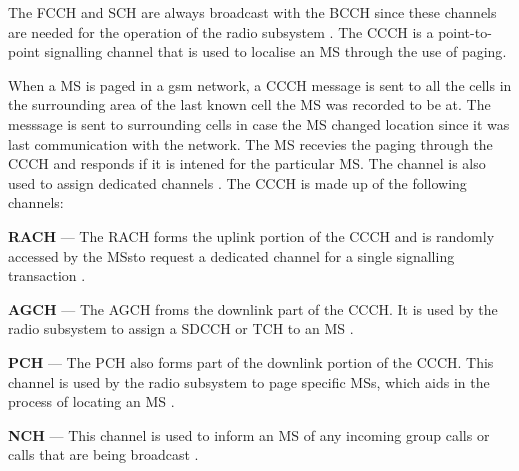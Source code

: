 The \gls{FCCH} and \gls{SCH} are always broadcast with the \gls{BCCH} since these channels are needed for the operation of the radio subsystem \cite{GSMArchitectureProtocolsServices}. The \gls{CCCH} is a point-to-point signalling channel that is used to localise an \gls{MS} through the use of paging\cite{GSMArchitectureProtocolsServices}. 

When a \gls{MS} is paged in a \gls{gsm} network, a \gls{CCCH} message is sent to all the cells in the surrounding area of the last known cell the \gls{MS} was recorded to be at\cite{GSMArchitectureProtocolsServices}. The messsage is sent to surrounding cells in case the \gls{MS} changed location since it was last communication with the network\cite{GSMArchitectureProtocolsServices}. The \gls{MS} recevies the paging through the \gls{CCCH} and responds if it is intened for the particular MS\cite{GSMArchitectureProtocolsServices}. The channel is also used to assign dedicated channels \cite{GSMArchitectureProtocolsServices}. The \gls{CCCH} is made up of the following channels:
\begin{description}
  \item{\textbf{\gls{RACH}}} --- The \gls{RACH} forms the uplink portion of the \gls{CCCH} and is randomly accessed by the \glspl{MS}to request a dedicated channel for a single signalling transaction \cite{GSMArchitectureProtocolsServices}.
  \item{\textbf{\gls{AGCH}}} --- The \gls{AGCH} froms the downlink part of the \gls{CCCH}\@. It is used by the radio subsystem to assign a \gls{SDCCH} or \gls{TCH} to an \gls{MS} \cite{GSMArchitectureProtocolsServices}.
  \item{\textbf{\gls{PCH}}} --- The \gls{PCH} also forms part of the downlink portion of the \gls{CCCH}\@. This channel is used by the radio subsystem to page specific \glspl{MS}, which aids in the process of locating an \gls{MS} \cite{GSMArchitectureProtocolsServices}.
\item{\textbf{\gls{NCH}}} --- This channel is used to inform an \gls{MS} of any incoming group calls or calls that are being broadcast \cite{GSMArchitectureProtocolsServices}.
\end{description}

